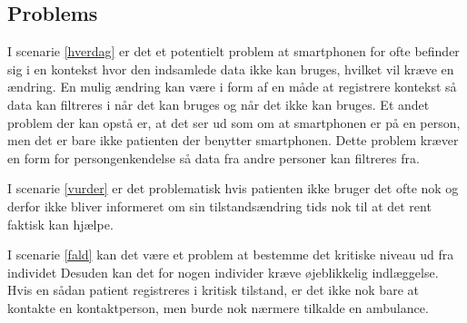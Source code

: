 \subsection{Problems}
I scenarie \ref{hverdag} er det et potentielt problem at smartphonen for ofte befinder sig i en kontekst hvor den indsamlede data ikke kan bruges, hvilket vil kræve en ændring.
En mulig ændring kan være i form af en måde at registrere kontekst så data kan filtreres i når det kan bruges og når det ikke kan bruges.
Et andet problem der kan opstå er, at det ser ud som om at smartphonen er på en person, men det er bare ikke patienten der benytter smartphonen.
Dette problem kræver en form for persongenkendelse så data fra andre personer kan filtreres fra.

I scenarie \ref{vurder} er det problematisk hvis patienten ikke bruger det ofte nok og derfor ikke bliver informeret om sin tilstandsændring tids nok til at det rent faktisk kan hjælpe.

I scenarie \ref{fald} kan det være et problem at bestemme det kritiske niveau ud fra individet
Desuden kan det for nogen individer kræve øjeblikkelig indlæggelse.
Hvis en sådan patient registreres i kritisk tilstand, er det ikke nok bare at kontakte en kontaktperson, men burde nok nærmere tilkalde en ambulance.